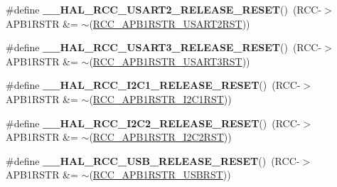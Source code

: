 \begin{DoxyCompactItemize}
\item 
\hypertarget{group___r_c_c___a_p_b1___force___release___reset_ga8baebf28a2739de5f3c5ef72519b9499}{\#define {\bfseries \-\_\-\-\_\-\-H\-A\-L\-\_\-\-R\-C\-C\-\_\-\-U\-S\-A\-R\-T2\-\_\-\-R\-E\-L\-E\-A\-S\-E\-\_\-\-R\-E\-S\-E\-T}()~(R\-C\-C-\/$>$A\-P\-B1\-R\-S\-T\-R \&= $\sim$(\hyperlink{group___peripheral___registers___bits___definition_ga195c39f08384ca1fa13b53a31d65d0a5}{R\-C\-C\-\_\-\-A\-P\-B1\-R\-S\-T\-R\-\_\-\-U\-S\-A\-R\-T2\-R\-S\-T}))}\label{group___r_c_c___a_p_b1___force___release___reset_ga8baebf28a2739de5f3c5ef72519b9499}

\item 
\hypertarget{group___r_c_c___a_p_b1___force___release___reset_ga25b71d0f7fb3b9455fb360fcb780c492}{\#define {\bfseries \-\_\-\-\_\-\-H\-A\-L\-\_\-\-R\-C\-C\-\_\-\-U\-S\-A\-R\-T3\-\_\-\-R\-E\-L\-E\-A\-S\-E\-\_\-\-R\-E\-S\-E\-T}()~(R\-C\-C-\/$>$A\-P\-B1\-R\-S\-T\-R \&= $\sim$(\hyperlink{group___peripheral___registers___bits___definition_ga766478ebdcbb647eb3f32962543bd194}{R\-C\-C\-\_\-\-A\-P\-B1\-R\-S\-T\-R\-\_\-\-U\-S\-A\-R\-T3\-R\-S\-T}))}\label{group___r_c_c___a_p_b1___force___release___reset_ga25b71d0f7fb3b9455fb360fcb780c492}

\item 
\hypertarget{group___r_c_c___a_p_b1___force___release___reset_ga87cc8c2107c1d0820cc1f7e2aeb1aeb9}{\#define {\bfseries \-\_\-\-\_\-\-H\-A\-L\-\_\-\-R\-C\-C\-\_\-\-I2\-C1\-\_\-\-R\-E\-L\-E\-A\-S\-E\-\_\-\-R\-E\-S\-E\-T}()~(R\-C\-C-\/$>$A\-P\-B1\-R\-S\-T\-R \&= $\sim$(\hyperlink{group___peripheral___registers___bits___definition_gadcd25346a7d7b0009090adfbca899b93}{R\-C\-C\-\_\-\-A\-P\-B1\-R\-S\-T\-R\-\_\-\-I2\-C1\-R\-S\-T}))}\label{group___r_c_c___a_p_b1___force___release___reset_ga87cc8c2107c1d0820cc1f7e2aeb1aeb9}

\item 
\hypertarget{group___r_c_c___a_p_b1___force___release___reset_ga2fa8cc909b285813af86c253ec110356}{\#define {\bfseries \-\_\-\-\_\-\-H\-A\-L\-\_\-\-R\-C\-C\-\_\-\-I2\-C2\-\_\-\-R\-E\-L\-E\-A\-S\-E\-\_\-\-R\-E\-S\-E\-T}()~(R\-C\-C-\/$>$A\-P\-B1\-R\-S\-T\-R \&= $\sim$(\hyperlink{group___peripheral___registers___bits___definition_ga412d59407e5dad43cf8ae1ea6f8bc5c3}{R\-C\-C\-\_\-\-A\-P\-B1\-R\-S\-T\-R\-\_\-\-I2\-C2\-R\-S\-T}))}\label{group___r_c_c___a_p_b1___force___release___reset_ga2fa8cc909b285813af86c253ec110356}

\item 
\hypertarget{group___r_c_c___a_p_b1___force___release___reset_ga8cdd5ad1a3d93937c9e9917e7d40f003}{\#define {\bfseries \-\_\-\-\_\-\-H\-A\-L\-\_\-\-R\-C\-C\-\_\-\-U\-S\-B\-\_\-\-R\-E\-L\-E\-A\-S\-E\-\_\-\-R\-E\-S\-E\-T}()~(R\-C\-C-\/$>$A\-P\-B1\-R\-S\-T\-R \&= $\sim$(\hyperlink{group___peripheral___registers___bits___definition_ga51baa4f973f66eb9781d690fa061f97f}{R\-C\-C\-\_\-\-A\-P\-B1\-R\-S\-T\-R\-\_\-\-U\-S\-B\-R\-S\-T}))}\label{group___r_c_c___a_p_b1___force___release___reset_ga8cdd5ad1a3d93937c9e9917e7d40f003}


\end{DoxyCompactItemize}
